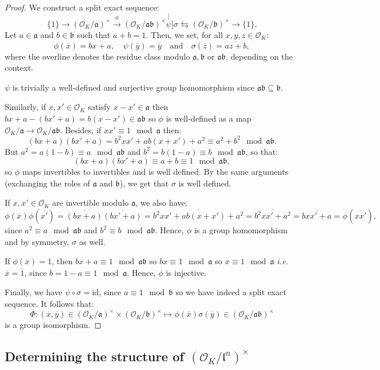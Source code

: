 \documentclass[a4paper,10pt,notitlepage]{report}
\theoremstyle{definition}
\theoremstyle{plain}
\theoremstyle{definition}
\newcommand{\ie}{\emph{i.e.}\ }
\newcommand{\mO}{\mathcal{O}}
\renewcommand{\(}{\left(}
\renewcommand{\)}{\right)}
\newcommand{\id}{\mbox{id}}
\newcommand{\mf}[1]{\mathfrak{#1}}
\begin{document}
\begin{proof}
We construct a split exact sequence:
\[\{1\}\longrightarrow(\mO_K/\mf{a})^\times\overset{\phi}{\longrightarrow}(\mO_K/\mf{a}\mf{b})^\times \stackrel[\psi]{\sigma}{\leftrightarrows}(\mO_K/\mf{b})^\times\longrightarrow\{1\}.\]
Let $a\in\mf{a}$ and $b\in\mf{b}$ such that $a+b=1$. Then, we set, for all $x,y,z\in\mO_K$:
\[\phi(\overline{x})=\overline{bx+a}, \quad \psi(\overline{y})=\overline{y} \quad \mbox{and} \quad \sigma(\overline{z})=\overline{az+b},\]
where the overline denotes the residue class modulo $\mf{a}, \mf{b}$ or $\mf{a}\mf{b}$, depending on the context. 

$\psi$ is trivially a well-defined and surjective group homomorphism since $\mf{a}\mf{b}\subseteq\mf{b}$. 

Similarly, if $x,x'\in\mO_K$ satisfy $x-x'\in\mf{a}$ then $bx+a-(bx'+a)=b(x-x')\in\mf{a}\mf{b}$ so $\phi$ is well-defined as a map $\mO_K/\mf{a}\longrightarrow\mO_K/\mf{a}\mf{b}$. Besides, if $xx'\equiv 1 \mod \mf{a}$ then:
\[(bx+a)(bx'+a)=b^2xx'+ab(x+x')+a^2\equiv a^2+b^2 \mod \mf{a}\mf{b}.\]
But $a^2=a(1-b)\equiv a \mod \mf{a}\mf{b}$ and $b^2=b(1-a)\equiv b \mod \mf{a}\mf{b}$, so that: 
\[(bx+a)(bx'+a)\equiv a+b\equiv 1 \mod \mf{a}\mf{b},\]
so $\phi$ maps invertibles to invertibles and is well defined. By the same arguments (exchanging the roles of $\mf{a}$ and $\mf{b}$), we get that $\sigma$ is well defined.

If $x,x'\in\mO_K$ are invertible modulo $\mf{a}$, we also have:
\[\phi(\overline{x})\phi(\overline{x'})=\overline{(bx+a)}\overline{(bx'+a)}=\overline{b^2xx'+ab(x+x')+a^2}=\overline{b^2xx'+a^2}=\overline{bxx'+a}=\phi(\overline{xx'}),\]
since $a^2\equiv a \mod \mf{a}\mf{b}$ and $b^2\equiv b \mod \mf{a}\mf{b}$. Hence, $\phi$ is a group homomorphism and by symmetry, $\sigma$ as well.

If $\phi(\overline{x})=1$, then $bx+a\equiv 1 \mod \mf{a}\mf{b}$ so $bx\equiv 1 \mod \mf{a}$ so $x\equiv 1 \mod \mf{a}$ \ie $\overline{x}=\overline{1}$, since $b=1-a\equiv 1 \mod \mf{a}$. Hence, $\phi$ is injective.

Finally, we have $\psi\circ\sigma=\id$, since $a\equiv 1 \mod \mf{b}$ so we have indeed a split exact sequence. It follows that:
\[\Phi : (\overline{x},\overline{y})\in(\mO_K/\mf{a})^\times\times (\mO_K/\mf{b})^\times\longmapsto \phi(\overline{x})\sigma(\overline{y})\in(\mO_K/\mf{a}\mf{b})^\times\]
is a group isomorphism.
\end{proof}

\subsection{Determining the structure of $(\mO_K/\mf{l}^n)^\times$}
\end{document}
